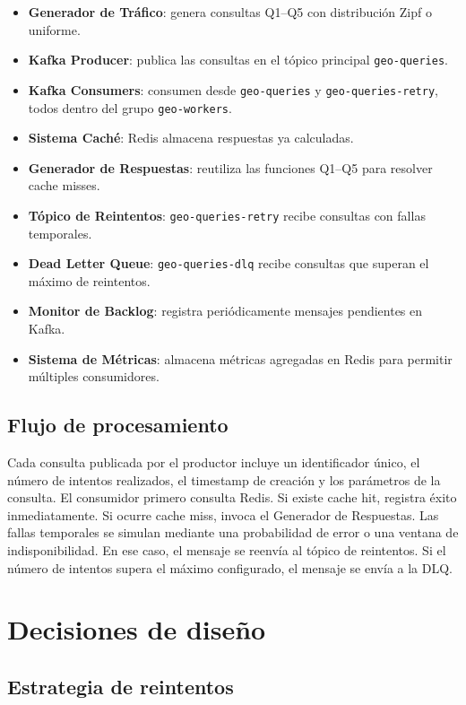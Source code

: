 \documentclass[11pt,letterpaper]{article}
\begin{document}
\begin{itemize}
    \item \textbf{Generador de Tráfico}: genera consultas Q1--Q5 con distribución Zipf o uniforme.
    \item \textbf{Kafka Producer}: publica las consultas en el tópico principal \texttt{geo-queries}.
    \item \textbf{Kafka Consumers}: consumen desde \texttt{geo-queries} y \texttt{geo-queries-retry}, todos dentro del grupo \texttt{geo-workers}.
    \item \textbf{Sistema Caché}: Redis almacena respuestas ya calculadas.
    \item \textbf{Generador de Respuestas}: reutiliza las funciones Q1--Q5 para resolver cache misses.
    \item \textbf{Tópico de Reintentos}: \texttt{geo-queries-retry} recibe consultas con fallas temporales.
    \item \textbf{Dead Letter Queue}: \texttt{geo-queries-dlq} recibe consultas que superan el máximo de reintentos.
    \item \textbf{Monitor de Backlog}: registra periódicamente mensajes pendientes en Kafka.
    \item \textbf{Sistema de Métricas}: almacena métricas agregadas en Redis para permitir múltiples consumidores.
\end{itemize}

\subsection{Flujo de procesamiento}

Cada consulta publicada por el productor incluye un identificador único, el número de intentos realizados, el timestamp de creación y los parámetros de la consulta. El consumidor primero consulta Redis. Si existe cache hit, registra éxito inmediatamente. Si ocurre cache miss, invoca el Generador de Respuestas. Las fallas temporales se simulan mediante una probabilidad de error o una ventana de indisponibilidad. En ese caso, el mensaje se reenvía al tópico de reintentos. Si el número de intentos supera el máximo configurado, el mensaje se envía a la DLQ.

\section{Decisiones de diseño}

\subsection{Estrategia de reintentos}
\end{document}
